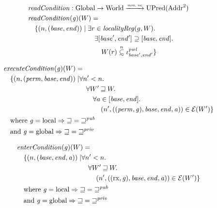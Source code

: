 \documentclass[a4paper]{article}
\newcommand{\monnefun}{\xrightarrow{\textit{\tiny{mon, ne}}}}
\newcommand{\fun}{\rightarrow}
\newcommand\subsetsim{\mathrel{\ooalign{\raise.2ex\hbox{$\subset$}\cr
      \hidewidth\lower.8ex\hbox{\scalebox{0.9}{$\sim$}}\hidewidth\cr}}}
\newcommand{\nsubsim}[1][n]{\stackrel{\tiny{#1}}{\subsetsim}}
\newcommand{\var}[1]{\mathit{#1}}
\newcommand{\gl}{\var{g}}
\newcommand{\addr}{\var{a}}
\newcommand{\start}{\var{base}}
\newcommand{\addrend}{\var{end}}
\newcommand{\perm}{\var{perm}}
\newcommand{\pwl}{\var{pwl}}
\newcommand{\plainfun}[2]{
  \ifthenelse{\equal{#2}{}}
  {\mathit{#1}}
  {\mathit{#1}(#2)}
}
\newcommand{\readCond}[1]{\plainfun{readCondition}{#1}}
\newcommand{\execCond}[1]{\plainfun{executeCondition}{#1}}
\newcommand{\entryCond}[1]{\plainfun{enterCondition}{#1}}
\newcommand{\future}{\mathbin{\sqsupseteq}}
\newcommand{\futurewk}{\mathbin{\sqsupseteq}^{\var{pub}}}
\newcommand{\futurestr}{\mathbin{\sqsupseteq}^{\var{priv}}}
\newcommand{\asmType}{\plaindom{AsmType}}
\newcommand{\plaindom}[1]{\mathrm{#1}}
\newcommand{\Addrs}{\plaindom{Addr}}
\newcommand{\Globals}{\plaindom{Global}}
\newcommand{\Worlds}{\plaindom{World}}
\newcommand{\UPred}[1]{\plaindom{UPred}(#1)}
\newcommand{\intr}[2]{\mathcal{#1}}
\newcommand{\exprintr}[1]{\intr{E}{#1}}
\newcommand{\stder}{\exprintr{\asmType}}
\newcommand{\npair}[2][n]{\left(#1,#2 \right)}
\newcommand{\plainperm}[1]{\mathrm{#1}}
\newcommand{\exec}{\plainperm{rx}}
\newcommand{\local}{\plainperm{local}}
\newcommand{\glob}{\plainperm{global}}
\begin{document}
\begin{align*}
  & \readCond{} : \Globals \fun \Worlds \monnefun \UPred{\Addrs^2}  \\
  & \readCond{}(\gl)(W) =  \\
  & \quad \begin{aligned}[t]
    \{ \npair{(\start,\addrend)} \mid & \;\exists r \in \var{localityReg}(g,W) \ldotp \\
    & \;\quad \exists [\start',\addrend'] \supseteq [\start,\addrend] \ldotp \\
    & \;\qquad W(r)\nsubsim[n] \iota_{\start',\addrend'}^\pwl \}
  \end{aligned}
\end{align*}

\begin{align*}
  & \execCond{}(\gl)(W) = \\
  & \quad
    \begin{aligned}[t]
      \{ \npair{(\perm,\start,\addrend)} \mid &  \forall n' < n \ldotp\\
      & \quad \forall W' \future W \ldotp\\
      & \qquad\forall a \in [\start,\addrend] \ldotp\\
      & \qquad \quad \npair[n']{((\perm,\gl),\start,\addrend,\addr)} \in \stder(W')\}
    \end{aligned} \\
  & \quad \text{where } \gl = \local \Rightarrow \future = \futurewk \\
  & \quad \text{and } \gl = \glob \Rightarrow \future = \futurestr
\end{align*}

\begin{align*}
  & \entryCond{}(\gl)(W) = \\
  & \quad
    \begin{aligned}[t]
      \{ \npair{(\start,\addrend,\addr)} \mid &  \forall n' < n \ldotp\\
      & \quad \forall W' \future W \ldotp\\
      & \qquad \npair[n']{((\exec,\gl),\start,\addrend,\addr)} \in \stder(W')\}
    \end{aligned} \\
  & \quad \text{where } \gl = \local \Rightarrow \future = \futurewk \\
  & \quad \text{and } \gl = \glob \Rightarrow \future = \futurestr
\end{align*}
\end{document}
